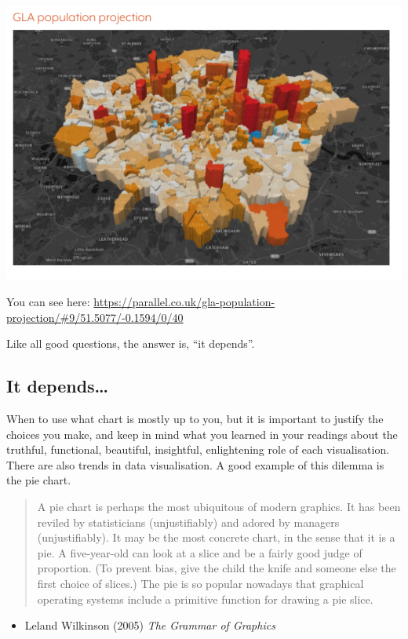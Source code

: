 \documentclass[
]{book}
\providecommand{\tightlist}{%
  \setlength{\itemsep}{0pt}\setlength{\parskip}{0pt}}
\begin{document}
\includegraphics{imgs/gla_pop.png}

You can see here: \url{https://parallel.co.uk/gla-population-projection/\#9/51.5077/-0.1594/0/40}

Like all good questions, the answer is, ``it depends''.

\hypertarget{it-depends}{%
\subsection{It depends\ldots{}}\label{it-depends}}

When to use what chart is mostly up to you, but it is important to justify the choices you make, and keep in mind what you learned in your readings about the truthful, functional, beautiful, insightful, enlightening role of each visualisation. There are also trends in data visualisation. A good example of this dilemma is the pie chart.

\begin{quote}
A pie chart is perhaps the most ubiquitous of modern graphics. It has been reviled by statisticians (unjustifiably) and adored by managers (unjustifiably). It may be the most concrete chart, in the sense that it is a pie. A five-year-old can look at a slice and be a fairly good judge of proportion. (To prevent bias, give the child the knife and someone else the first choice of slices.) The pie is so popular nowadays that graphical operating systems include a primitive function for drawing a pie slice.
\end{quote}

\begin{itemize}
\tightlist
\item
  Leland Wilkinson (2005) \emph{The Grammar of Graphics}
\end{itemize}
\end{document}
